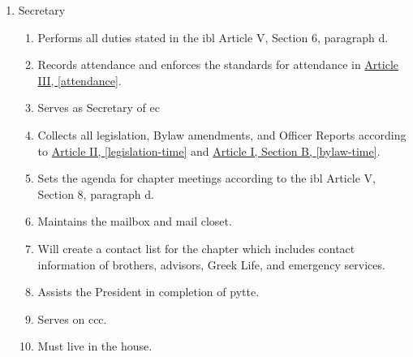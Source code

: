 \begin{enumerate}
		\item Secretary
			\begin{enumerate}
				\item Performs all duties stated in the \gls{ibl} Article V, Section 6, paragraph d.
				\item Records attendance and enforces the standards for attendance in \hyperref[attendance]{Article III, \autoref*{attendance}}.
				\item Serves as Secretary of \gls{ec} 
				\item Collects all legislation, Bylaw amendments, and Officer Reports according to \hyperref[legislation-time]{Article II, \autoref*{legislation-time}} and \hyperref[bylaw-time]{Article I, Section B, \autoref*{bylaw-time}}.
				\item Sets the agenda for chapter meetings according to the \gls{ibl} Article V, Section 8, paragraph d.
				\item Maintains the mailbox and mail closet.
				\item Will create a contact list for the chapter which includes contact information of brothers, advisors, Greek Life, and emergency services.
				\item Assists the President in completion of \gls{pytte}.
				\item Serves on \gls{ccc}.
				\item Must live in the house.
			\end{enumerate}


\end{enumerate}
